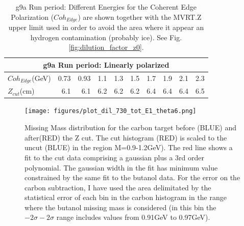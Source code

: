 \begin{table}
  \begin{center}
    \begin{tabular}{ ||l|r|r|r|r|r|r|r|r|r||}
      \hline
      \multicolumn{10}{|c|}{g9a Run period: Linearly polarized } \\
      \hline
      $Coh_{Edge}$(GeV)&0.73&0.93&1.1&1.3&1.5&1.7&1.9&2.1&2.3 \\
      \hline
      $Z_{cut}$(cm)&6.1&6.1&6.2&6.2&6.2&6.4&6.4&6.4&6.5 \\
      \hline
    \end{tabular}
  \end{center}
  \caption{g9a Run period: Different Energies for the Coherent Edge Polarization ($Coh_{Edge}$) are shown together with the MVRT.Z upper limit used in order to avoid the area where it appear an hydrogen contamination (probably ice). See Fig. \ref{fig:dilution_factor_z0}.}
  \label{table:dil_factor_zcut}
\end{table}

\begin{figure}[H]
  \begin{center}
    \texttt{[image: figures/plot\_dil\_730\_tot\_E1\_theta6.png]} \\
    \caption{Missing Mass distribution for the carbon target before (BLUE) and after(RED) the Z cut. The cut histogram (RED) is scaled to the uncut (BLUE) in the region M=0.9-1.2GeV). The red line shows a fit to the cut data comprising a gaussian plus a 3rd order polynomial. The gaussian width in the fit has minimum value constrained by the same fit to the butanol data.  
 For the error on the carbon subtraction, I have used the area delimitated by the statistical error of each bin in the carbon histogram in the range where the butanol missing mass is considered (in this bin the $-2\sigma - 2\sigma$ range includes values from 0.91GeV to 0.97GeV).}
    \label{fig:dilution_mass_zcut}
  \end{center}
\end{figure}


